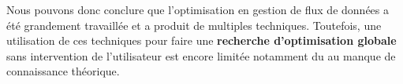 Nous pouvons donc conclure que l'optimisation en gestion de flux de données a été grandement travaillée et a produit de multiples techniques. Toutefois, une utilisation de ces techniques pour faire une \textbf{recherche d'optimisation globale} sans intervention de l'utilisateur est encore limitée notamment du au manque de connaissance théorique.
